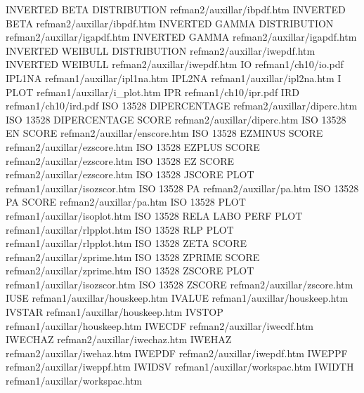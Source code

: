 INVERTED BETA DISTRIBUTION              refman2/auxillar/ibpdf.htm
INVERTED BETA                           refman2/auxillar/ibpdf.htm
INVERTED GAMMA DISTRIBUTION             refman2/auxillar/igapdf.htm
INVERTED GAMMA                          refman2/auxillar/igapdf.htm
INVERTED WEIBULL DISTRIBUTION           refman2/auxillar/iwepdf.htm
INVERTED WEIBULL                        refman2/auxillar/iwepdf.htm
IO                                      refman1/ch10/io.pdf
IPL1NA                                  refman1/auxillar/ipl1na.htm
IPL2NA                                  refman1/auxillar/ipl2na.htm
I PLOT                                  refman1/auxillar/i_plot.htm
IPR                                     refman1/ch10/ipr.pdf
IRD                                     refman1/ch10/ird.pdf
ISO 13528 DIPERCENTAGE                  refman2/auxillar/diperc.htm
ISO 13528 DIPERCENTAGE SCORE            refman2/auxillar/diperc.htm
ISO 13528 EN SCORE                      refman2/auxillar/enscore.htm
ISO 13528 EZMINUS SCORE                 refman2/auxillar/ezscore.htm
ISO 13528 EZPLUS SCORE                  refman2/auxillar/ezscore.htm
ISO 13528 EZ SCORE                      refman2/auxillar/ezscore.htm
ISO 13528 JSCORE PLOT                   refman1/auxillar/isozscor.htm
ISO 13528 PA                            refman2/auxillar/pa.htm
ISO 13528 PA SCORE                      refman2/auxillar/pa.htm
ISO 13528 PLOT                          refman1/auxillar/isoplot.htm
ISO 13528 RELA LABO PERF PLOT           refman1/auxillar/rlpplot.htm
ISO 13528 RLP PLOT                      refman1/auxillar/rlpplot.htm
ISO 13528 ZETA SCORE                    refman2/auxillar/zprime.htm
ISO 13528 ZPRIME SCORE                  refman2/auxillar/zprime.htm
ISO 13528 ZSCORE PLOT                   refman1/auxillar/isozscor.htm
ISO 13528 ZSCORE                        refman2/auxillar/zscore.htm
IUSE                                    refman1/auxillar/houskeep.htm
IVALUE                                  refman1/auxillar/houskeep.htm
IVSTAR                                  refman1/auxillar/houskeep.htm
IVSTOP                                  refman1/auxillar/houskeep.htm
IWECDF                                  refman2/auxillar/iwecdf.htm
IWECHAZ                                 refman2/auxillar/iwechaz.htm
IWEHAZ                                  refman2/auxillar/iwehaz.htm
IWEPDF                                  refman2/auxillar/iwepdf.htm
IWEPPF                                  refman2/auxillar/iweppf.htm
IWIDSV                                  refman1/auxillar/workspac.htm
IWIDTH                                  refman1/auxillar/workspac.htm
